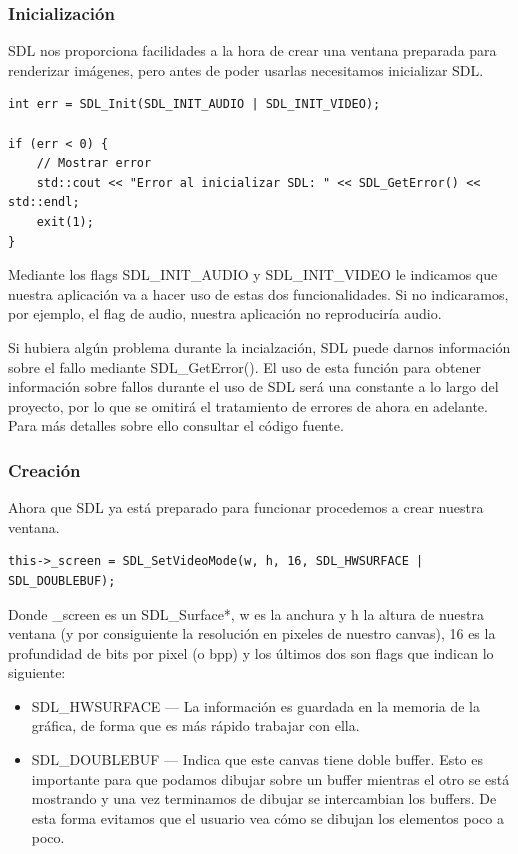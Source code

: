 \documentclass[parskip=half*]{scrartcl}
\begin{document}
		\subsubsection{Inicializaci\'on}
			SDL nos proporciona facilidades a la hora de crear una ventana preparada para renderizar im\'agenes, pero antes de poder usarlas necesitamos inicializar SDL.

			\begin{verbatim}
int err = SDL_Init(SDL_INIT_AUDIO | SDL_INIT_VIDEO);
    
if (err < 0) {
    // Mostrar error
    std::cout << "Error al inicializar SDL: " << SDL_GetError() << std::endl;
    exit(1);
}
			\end{verbatim}

			Mediante los flags SDL\_INIT\_AUDIO y SDL\_INIT\_VIDEO le indicamos que nuestra aplicaci\'on va a hacer uso de estas dos funcionalidades. Si no indicaramos, por ejemplo, el flag de audio, nuestra aplicaci\'on no reproducir\'ia audio.

			Si hubiera alg\'un problema durante la incialzaci\'on, SDL puede darnos informaci\'on sobre el fallo mediante SDL\_GetError(). El uso de esta funci\'on para obtener informaci\'on sobre fallos durante el uso de SDL ser\'a una constante a lo largo del proyecto, por lo que se omitir\'a el tratamiento de errores de ahora en adelante. Para m\'as detalles sobre ello consultar el c\'odigo fuente.

			\subsubsection{Creaci\'on}
				Ahora que SDL ya est\'a preparado para funcionar procedemos a crear nuestra ventana.

				\begin{verbatim}
this->_screen = SDL_SetVideoMode(w, h, 16, SDL_HWSURFACE | SDL_DOUBLEBUF);
				\end{verbatim}

				Donde \_screen es un SDL\_Surface*, w es la anchura y h la altura de nuestra ventana (y por consiguiente la resoluci\'on en pixeles de nuestro canvas), 16 es la profundidad de bits por pixel (o bpp) y los \'ultimos dos son flags que indican lo siguiente:

				\begin{itemize}
					\item SDL\_HWSURFACE --- La informaci\'on es guardada en la memoria de la gr\'afica, de forma que es m\'as r\'apido trabajar con ella.

					\item SDL\_DOUBLEBUF --- Indica que este canvas tiene doble buffer. Esto es importante para que podamos dibujar sobre un buffer mientras el otro se est\'a mostrando y una vez terminamos de dibujar se intercambian los buffers. De esta forma evitamos que el usuario vea c\'omo se dibujan los elementos poco a poco.
				\end{itemize}
\end{document}
